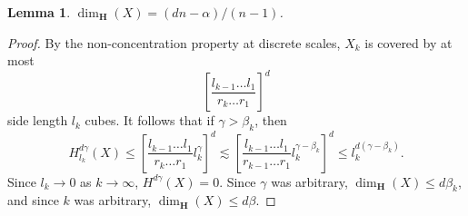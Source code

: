 \documentclass[dvipsnames]{article}
\theoremstyle{plain}
\newtheorem{lemma}{Lemma}
\theoremstyle{plain}
\begin{document}
\begin{lemma}
	$\dim_{\mathbf{H}}(X) = (dn - \alpha)/(n-1)$.
\end{lemma}
\begin{proof}
	By the non-concentration property at discrete scales, $X_k$ is covered by at most
	\[ \left[ \frac{l_{k-1} \dots l_1}{r_k \dots r_1} \right]^d \]
	side length $l_k$ cubes. It follows that if $\gamma > \beta_k$, then
	\[ H^{d\gamma}_{l_k}(X) \leq \left[ \frac{l_{k-1} \dots l_1}{r_k \dots r_1} l_k^\gamma \right]^d \lesssim \left[ \frac{l_{k-1} \dots l_1}{r_{k-1} \dots r_1} l_k^{\gamma - \beta_k} \right]^d \leq l_k^{d(\gamma - \beta_k)}. \]
	Since $l_k \to 0$ as $k \to \infty$, $H^{d \gamma}(X) = 0$. Since $\gamma$ was arbitrary, $\dim_{\mathbf{H}}(X) \leq d \beta_k$, and since $k$ was arbitrary, $\dim_{\mathbf{H}}(X) \leq d \beta$.
\end{proof}


\end{document}
